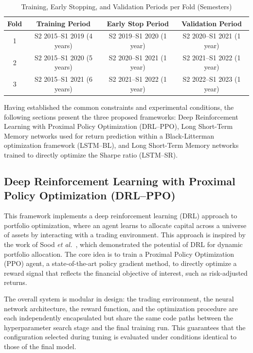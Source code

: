 \begin{table}[ht]
\centering
\caption{Training, Early Stopping, and Validation Periods per Fold (Semesters)}
\label{tab:train_val_periods}
\begin{tabular}{|c|c|c|c|}
\hline
\textbf{Fold} & \textbf{Training Period} & \textbf{Early Stop Period} & \textbf{Validation Period} \\
\hline
1 & S2 2015--S1 2019 (4 years) & S2 2019--S1 2020 (1 year) & S2 2020--S1 2021 (1 year) \\
2 & S2 2015--S1 2020 (5 years) & S2 2020--S1 2021 (1 year) & S2 2021--S1 2022 (1 year) \\
3 & S2 2015--S1 2021 (6 years) & S2 2021--S1 2022 (1 year) & S2 2022--S1 2023 (1 year) \\
\hline
\end{tabular}
\end{table}

Having established the common constraints and experimental conditions, the following sections present the three proposed frameworks: Deep Reinforcement Learning with Proximal Policy Optimization (DRL--PPO), Long Short-Term Memory networks used for return prediction within a Black-Litterman optimization framework (LSTM--BL), and Long Short-Term Memory networks trained to directly optimize the Sharpe ratio (LSTM--SR).

\subsection{Deep Reinforcement Learning with Proximal Policy Optimization (DRL--PPO)}

This framework implements a deep reinforcement learning (DRL) approach to portfolio optimization, where an agent learns to allocate capital across a universe of assets by interacting with a trading environment. This approach is inspired by the work of Sood \emph{et al.}~\cite{0df79}, which demonstrated the potential of DRL for dynamic portfolio allocation. The core idea is to train a Proximal Policy Optimization (PPO) agent, a state-of-the-art policy gradient method, to directly optimize a reward signal that reflects the financial objective of interest, such as risk-adjusted returns.

The overall system is modular in design: the trading environment, the neural network architecture, the reward function, and the optimization procedure are each independently encapsulated but share the same code paths between the hyperparameter search stage and the final training run. This guarantees that the configuration selected during tuning is evaluated under conditions identical to those of the final model.

